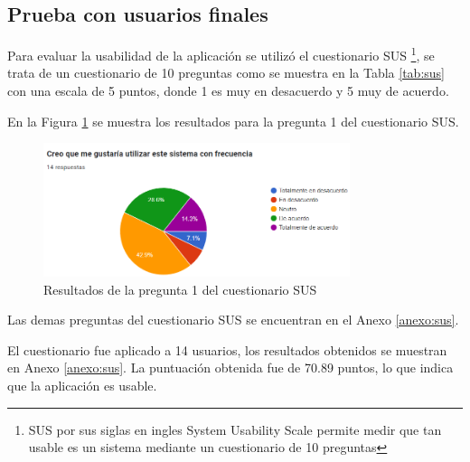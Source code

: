 \subsection{Prueba con usuarios finales}
Para evaluar la usabilidad de la aplicación se utilizó el cuestionario SUS \footnote{SUS por sus siglas en ingles System Usability Scale permite medir que tan usable es un sistema mediante un cuestionario de 10 preguntas }, se trata de un cuestionario de 10 preguntas como se muestra en la Tabla \ref{tab:sus} con una escala de 5 puntos, donde 1 es muy en desacuerdo y 5 muy de acuerdo. 

En la Figura \ref{fig:sus} se muestra los resultados para la pregunta 1 del cuestionario SUS.

\begin{figure}[H]
    \centering
    \includegraphics[width=0.8\textwidth]{../02Figures/03Chapter/sus.png}
    \caption{Resultados de la pregunta 1 del cuestionario SUS}\label{fig:sus}
\end{figure}

Las demas preguntas del cuestionario SUS se encuentran en el Anexo \ref{anexo:sus}.




El cuestionario fue aplicado a 14 usuarios, los resultados obtenidos se muestran en Anexo \ref{anexo:sus}. 
La puntuación obtenida fue de 70.89 puntos, lo que indica que la aplicación es usable. 